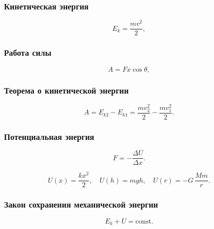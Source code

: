 \documentclass[12pt, a4paper]{article}
\begin{document}
\subsubsection*{Кинетическая энергия}

\[
E_k = \frac{m v^2}{2},
\]

\subsubsection*{Работа силы}

\[
A = Fx\cos\theta,
\]

\subsubsection*{Теорема о кинетической энергии}

\[
A = E_{k2} - E_{k1} = \frac{m v_2^2}{2} - \frac{m v_1^2}{2}.
\]

\subsubsection*{Потенциальная энергия}

\[
F = -\frac{\Delta U}{\Delta x}.
\]

\[
U(x) = \frac{k x^2}{2},
\quad
U(h) = m g h,
\quad
U(r) = -G\,\frac{M m}{r}.
\]

\subsubsection*{Закон сохранения механической энергии}

\[
E_k + U = \text{const}.
\]
\end{document}
